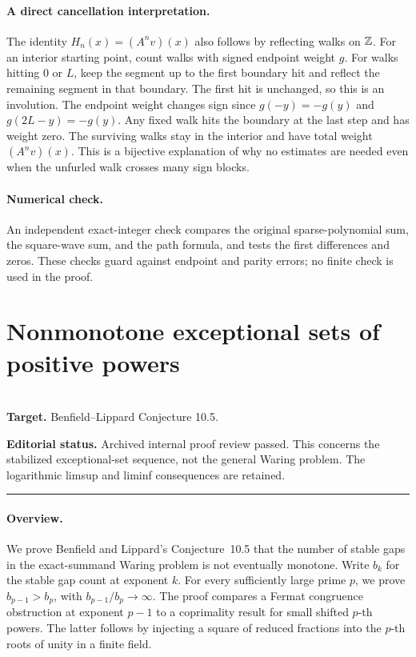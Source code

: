 \documentclass[11pt,a4paper]{article}
\begin{document}
\paragraph{A direct cancellation interpretation.}
The identity \(H_n(x)=(A^n v)(x)\) also follows by reflecting walks on \(\mathbb Z\). For an interior starting point, count walks with signed endpoint weight \(g\). For walks hitting \(0\) or \(L\), keep the segment up to the first boundary hit and reflect the remaining segment in that boundary. The first hit is unchanged, so this is an involution. The endpoint weight changes sign since \(g(-y)=-g(y)\) and \(g(2L-y)=-g(y)\). Any fixed walk hits the boundary at the last step and has weight zero. The surviving walks stay in the interior and have total weight \((A^n v)(x)\). This is a bijective explanation of why no estimates are needed even when the unfurled walk crosses many sign blocks.

\paragraph{Numerical check.}
An independent exact-integer check compares the original sparse-polynomial sum, the square-wave sum, and the path formula, and tests the first differences and zeros. These checks guard against endpoint and parity errors; no finite check is used in the proof.
\endgroup


\clearpage

\section{Nonmonotone exceptional sets of positive powers}
\label{section:R18K}
\\[3pt]
\noindent\textbf{Target.} Benfield--Lippard Conjecture 10.5.

\noindent\textbf{Editorial status.} Archived internal proof review passed. This concerns the stabilized exceptional-set sequence, not the general Waring problem. The logarithmic limsup and liminf consequences are retained.

\smallskip\hrule\medskip



\begingroup
\newcommand{\N}{\mathbb N}
\newcommand{\B}{\mathbf B}
\setcounter{equation}{0}
\renewcommand{\theequation}{\thesection.\arabic{equation}}
\renewcommand{\theHequation}{R18K.\arabic{equation}}
\paragraph{Overview.}
We prove Benfield and Lippard's Conjecture~10.5 that the number of
stable gaps in the exact-summand Waring problem is not eventually
monotone. Write \(b_k\) for the stable gap count at exponent \(k\).
For every sufficiently large prime \(p\), we prove
\(b_{p-1}>b_p\), with \(b_{p-1}/b_p\longrightarrow\infty\).
The proof compares a Fermat congruence obstruction at exponent
\(p-1\) to a coprimality result for small shifted \(p\)-th powers.
The latter follows by injecting a square of reduced fractions
into the \(p\)-th roots of unity in a finite field.
\end{document}
